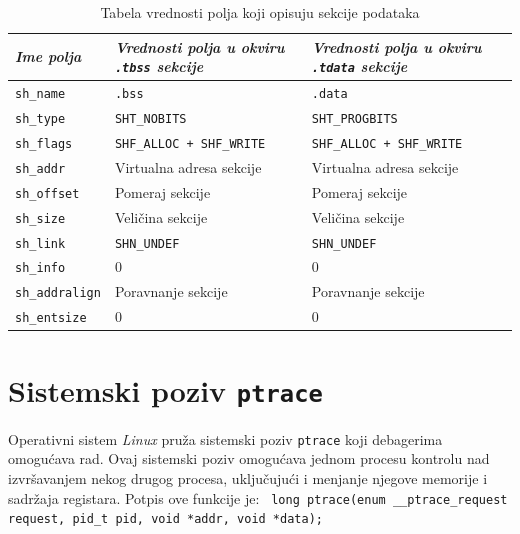 \documentclass[12pt,oneside]{memoir}
\begin{document}
\begin{table}[H]
	\begin{center}
		\begin{tabular}{ | l | p{5cm} | p{5cm} |}
			\hline
	    	\emph{Ime polja} & \emph{Vrednosti polja u okviru \texttt{.tbss} sekcije} & \emph{Vrednosti polja u okviru \texttt{.tdata} sekcije} \\ \hline
			\texttt{sh\_name} & \texttt{.bss} & \texttt{.data} \\ \hline
			\texttt{sh\_type} & \texttt{SHT\_NOBITS} & \texttt{SHT\_PROGBITS} \\ \hline
			\texttt{sh\_flags} & \texttt{SHF\_ALLOC + SHF\_WRITE} & \texttt{SHF\_ALLOC + SHF\_WRITE} \\ \hline
			\texttt{sh\_addr} & Virtualna adresa sekcije & Virtualna adresa sekcije \\ \hline
			\texttt{sh\_offset} & Pomeraj sekcije & Pomeraj sekcije \\ \hline
			\texttt{sh\_size} & Veličina sekcije & Veličina sekcije \\ \hline
			\texttt{sh\_link} & \texttt{SHN\_UNDEF} & \texttt{SHN\_UNDEF} \\ \hline
			\texttt{sh\_info} & 0 & 0 \\ \hline
			\texttt{sh\_addralign} & Poravnanje sekcije & Poravnanje sekcije \\ \hline
			\texttt{sh\_entsize} & 0 & 0 \\ \hline
		\end{tabular}
	\end{center}
	\caption{\label{tab:elf_secs}Tabela vrednosti polja koji opisuju sekcije podataka}
\end{table}

\section{Sistemski poziv \texttt{ptrace}}

Operativni sistem \emph{Linux} pruža sistemski poziv \texttt{ptrace} \cite{ptrace} koji debagerima omogućava rad. Ovaj sistemski poziv omogućava jednom procesu kontrolu nad izvršavanjem nekog drugog procesa, uključujući i menjanje njegove memorije i sadržaja registara.
Potpis ove funkcije je:
\newline\newline
\texttt{ long ptrace\newline(enum \_\_ptrace\_request request, pid\_t pid, void *addr, void *data);}
\newline
\end{document}
